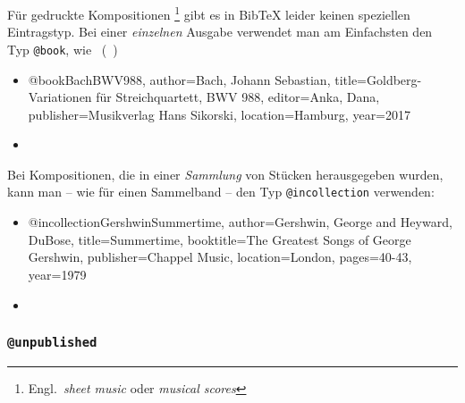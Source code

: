 Für gedruckte Kompositionen%
\footnote{Engl.\ \emph{sheet music} oder \emph{musical scores}} gibt es in BibTeX leider keinen
speziellen Eintragstyp. Bei einer \emph{einzelnen} Ausgabe verwendet man am Einfachsten den Typ 
\texttt{@book}, wie \zB\ (\sa\ \cite{HaydnCelloConcerto2,ShostakovichOp110})
%
\begin{itemize}
\item[]
\begin{GenericCode}[numbers=none]
@book{BachBWV988,
	author={Bach, Johann Sebastian},
	title={Goldberg-Variationen für Streichquartett, BWV 988},
	editor={Anka, Dana},
	publisher={Musikverlag Hans Sikorski},
	location={Hamburg},
	year={2017}
}
\end{GenericCode}
\item[\cite{BachBWV988}] 
\end{itemize}
%
Bei Kompositionen, die in einer \emph{Sammlung} von Stücken herausgegeben wurden,
kann man -- wie für einen Sammelband -- den Typ \texttt{@incollection} verwenden:
%
\begin{itemize}
\item[]
\begin{GenericCode}[numbers=none]
@incollection{GershwinSummertime,
	author={Gershwin, George and Heyward, DuBose},
	title={Summertime},
	booktitle={The Greatest Songs of George Gershwin},
	publisher={Chappel Music},
	location={London},
	pages={40-43},
	year={1979}
}
\end{GenericCode}
\item[\cite{GershwinSummertime}] 
\end{itemize}



\subsubsection{\texttt{@unpublished}}
\label{sec:@unpublished}

